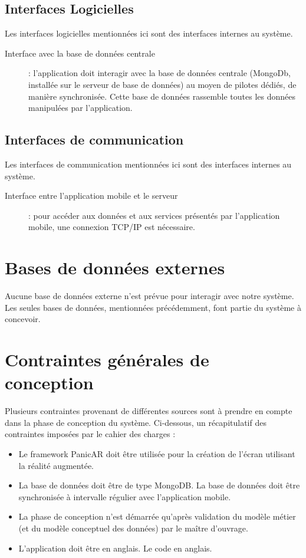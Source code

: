 \documentclass[a4paper,12pt]{report}
\begin{document}
\begin{onehalfspace}
\section{Interfaces Logicielles}
Les interfaces logicielles mentionnées ici sont des interfaces internes au système.

\begin{description}
  \item[Interface avec la base de données centrale]: l'application doit interagir avec la base de données centrale (MongoDb, installée sur le serveur de base de données) au moyen de pilotes dédiés, de manière synchronisée. Cette base de données rassemble toutes les données manipulées par l'application.

\end{description}

\section{Interfaces de communication}
  Les interfaces de communication mentionnées ici sont des interfaces internes au système.

  \begin{description}
    \item[Interface entre l'application mobile et le serveur]: pour accéder aux données et aux services présentés par l'application mobile, une connexion TCP/IP est nécessaire.
  \end{description}

\chapter{Bases de données externes}
  Aucune base de données externe n'est prévue pour interagir avec notre système. Les seules bases de données, mentionnées précédemment, font partie du système à concevoir.

\chapter{Contraintes générales de conception}
  Plusieurs contraintes provenant de différentes sources sont à prendre en compte dans la phase de conception du système. Ci-dessous, un récapitulatif des contraintes imposées par le cahier des charges :

\begin{itemize}
  \item Le framework PanicAR doit être utilisée pour la création de l'écran utilisant la réalité augmentée.
  \item La base de données doit être de type MongoDB. La base de données doit être synchronisée à intervalle régulier avec l'application mobile.
  \item La phase de conception n'est démarrée qu'après validation du modèle métier (et du modèle conceptuel des données) par le maître d'ouvrage.
  \item L'application doit être en anglais. Le code en anglais.
\end{itemize}


\end{onehalfspace}
\end{document}
